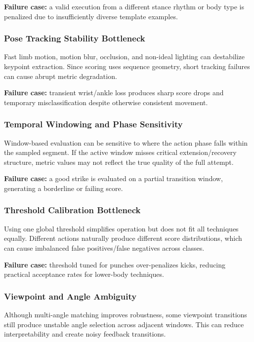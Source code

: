 \documentclass[12pt]{article}
\begin{document}
{\textbf{Failure case:} a valid execution from a different stance rhythm or body type is penalized due to insufficiently diverse template examples.

\subsubsection{Pose Tracking Stability Bottleneck}

Fast limb motion, motion blur, occlusion, and non-ideal lighting can destabilize keypoint extraction. Since scoring uses sequence geometry, short tracking failures can cause abrupt metric degradation.

\textbf{Failure case:} transient wrist/ankle loss produces sharp score drops and temporary misclassification despite otherwise consistent movement.

\subsubsection{Temporal Windowing and Phase Sensitivity}

Window-based evaluation can be sensitive to where the action phase falls within the sampled segment. If the active window misses critical extension/recovery structure, metric values may not reflect the true quality of the full attempt.

\textbf{Failure case:} a good strike is evaluated on a partial transition window, generating a borderline or failing score.

\subsubsection{Threshold Calibration Bottleneck}

Using one global threshold simplifies operation but does not fit all techniques equally. Different actions naturally produce different score distributions, which can cause imbalanced false positives/false negatives across classes.

\textbf{Failure case:} threshold tuned for punches over-penalizes kicks, reducing practical acceptance rates for lower-body techniques.

\subsubsection{Viewpoint and Angle Ambiguity}

Although multi-angle matching improves robustness, some viewpoint transitions still produce unstable angle selection across adjacent windows. This can reduce interpretability and create noisy feedback transitions.

}
\end{document}
